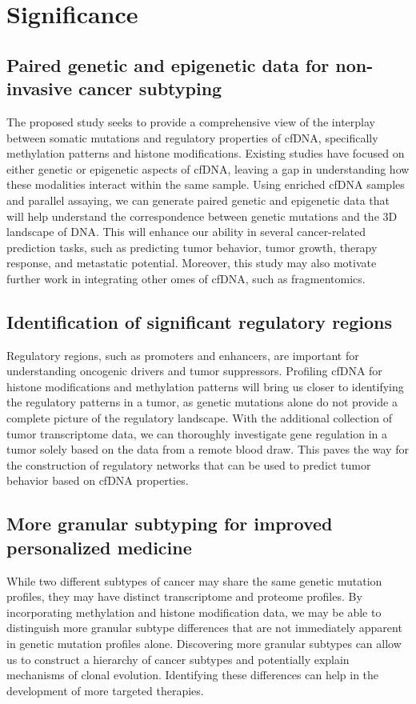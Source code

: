 \documentclass[11pt]{article}
\begin{document}
\newpage
\section*{Significance}
\subsection*{Paired genetic and epigenetic data for non-invasive cancer subtyping} The proposed study seeks to provide a comprehensive view of the interplay between somatic mutations and regulatory properties of cfDNA, specifically methylation patterns and histone modifications. 
Existing studies have focused on either genetic or epigenetic aspects of cfDNA, leaving a gap in understanding how these modalities interact within the same sample. 
Using enriched cfDNA samples and parallel assaying, we can generate paired genetic and epigenetic data that will help understand the correspondence between genetic mutations and the 3D landscape of DNA.
This will enhance our ability in several cancer-related prediction tasks, such as predicting tumor behavior, tumor growth, therapy response, and metastatic potential. 
Moreover, this study may also motivate further work in integrating other omes of cfDNA, such as fragmentomics.  
\subsection*{Identification of significant regulatory regions} Regulatory regions, such as promoters and enhancers, are important for understanding oncogenic drivers and tumor suppressors. 
Profiling cfDNA for histone modifications and methylation patterns will bring us closer to identifying the regulatory patterns in a tumor, as genetic mutations alone do not provide a complete picture of the regulatory landscape. 
With the additional collection of tumor transcriptome data, we can thoroughly investigate gene regulation in a tumor solely based on the data from a remote blood draw.
This paves the way for the construction of regulatory networks that can be used to predict tumor behavior based on cfDNA properties.
\subsection*{More granular subtyping for improved personalized medicine}
While two different subtypes of cancer may share the same genetic mutation profiles,
they may have distinct transcriptome and proteome profiles.
By incorporating methylation and histone modification data, we may be able to
distinguish more granular subtype differences that are not immediately apparent
in genetic mutation profiles alone.
Discovering more granular subtypes can allow us to construct a hierarchy of cancer subtypes and potentially explain mechanisms of clonal evolution. 
Identifying these differences can help in the development of more targeted therapies.
\end{document}
